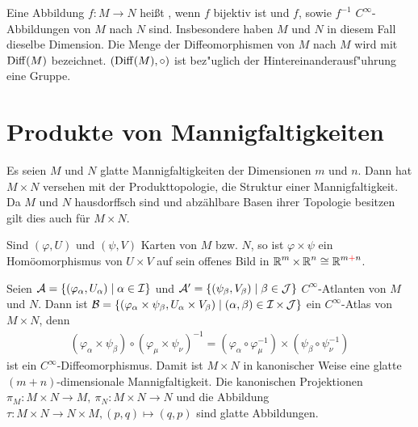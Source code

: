 \begin{Dfn}[Diffeomorphismus]
Eine Abbildung $f \colon M \to N$ hei\ss t , wenn $f$ bijektiv ist und $f$, sowie $f^{-1}$ $C^{\infty}$-Abbildungen von $M$ nach $N$ sind. Insbesondere haben $M$ und $N$ in diesem Fall dieselbe Dimension. Die Menge der Diffeomorphismen von $M$ nach $M$ wird mit $\operatorname{Diff}(M)$ bezeichnet. $(\operatorname{Diff}(M), \circ)$ ist bez"uglich der Hintereinanderausf"uhrung eine Gruppe.
\end{Dfn}



\section{Produkte von Mannigfaltigkeiten}

Es seien $M$ und $N$ glatte Mannigfaltigkeiten der Dimensionen $m$ und $n$. Dann hat $M \times N$ versehen mit der \gls{Produkttopologie}, die Struktur einer Mannigfaltigkeit. Da $M$ und $N$ hausdorffsch sind und abzählbare Basen ihrer Topologie besitzen gilt dies auch für $M \times N$.

Sind $(\varphi, U)$ und $(\psi, V)$ Karten von $M$ bzw. $N$, so ist $\varphi \times \psi$ ein Homöomorphismus von $U \times V$ auf sein offenes Bild in $\operatorname{\mathbb{R}}^m \times \operatorname{\mathbb{R}}^n \cong \operatorname{\mathbb{R}}^{m \textcolor{red}{+} n}$.

Seien $\mathcal A = \{(\varphi_{\alpha}, U_{\alpha}) \mid \alpha \in \operatorname{\mathcal{I}} \}$ und $\mathcal A' = \{(\psi_{\beta}, V_{\beta}) \mid \beta \in \operatorname{\mathcal{J}}\}$ $C^{\infty}$-Atlanten von $M$ und $N$. Dann ist $\mathcal B = \{(\varphi_{\alpha}\times\psi_{\beta},U_{\alpha}\times V_{\beta}) \mid (\alpha, \beta) \in \operatorname{\mathcal{I}} \times \operatorname{\mathcal{J}}\}$ ein $C^{\infty}$-Atlas von $M\times N$, denn 
\begin{align*}
  (\varphi_{\alpha} \times \psi_{\beta}) \circ (\varphi_{\mu} \times \psi_{\nu})^{-1} = (\varphi_{\alpha} \circ \varphi_{\mu}^{-1}) \times (\psi_{\beta} \circ \psi_{\nu}^{-1})
\end{align*}
ist ein $C^{\infty}$-Diffeomorphismus. Damit ist $M\times N$ in kanonischer Weise eine glatte $(m+n)$-dimensionale Mannigfaltigkeit. Die kanonischen Projektionen $\pi_M\colon M\times N \to M, \ \pi_N\colon M \times N \to N$ und die Abbildung $\tau \colon M \times N \to N \times M, (p,q) \mapsto (q,p)$ sind glatte Abbildungen.

